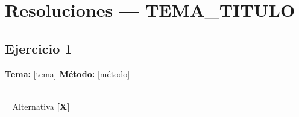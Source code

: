 
\section*{Resoluciones — {{TEMA_TITULO}}}

\subsection*{Ejercicio 1}

\begin{problema}
\end{problema}

\textbf{\sffamily\color{AzulMedio}Tema:} [tema] \quad
\textbf{\sffamily\color{AzulMedio}Método:} [método]


\begin{align*}
\end{align*}


\begin{cajarespuesta}
  $\boxed{\;\;}$ \quad Alternativa \textbf{[X]}
\end{cajarespuesta}
